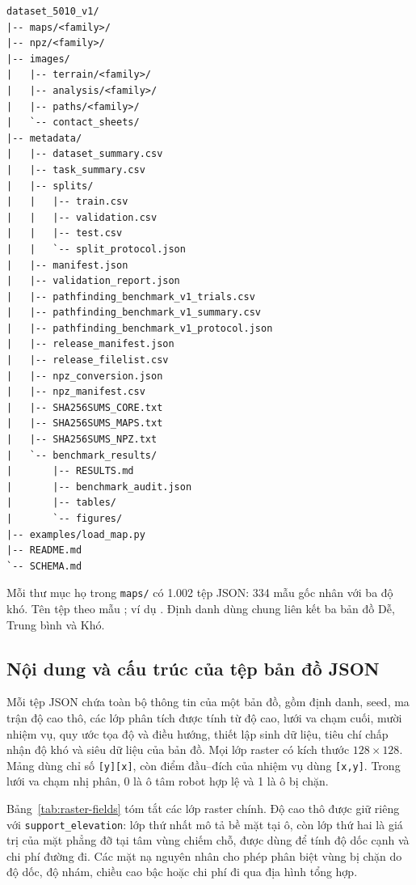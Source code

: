 \documentclass[11pt]{article}
\begin{document}
\begin{verbatim}
dataset_5010_v1/
|-- maps/<family>/
|-- npz/<family>/
|-- images/
|   |-- terrain/<family>/
|   |-- analysis/<family>/
|   |-- paths/<family>/
|   `-- contact_sheets/
|-- metadata/
|   |-- dataset_summary.csv
|   |-- task_summary.csv
|   |-- splits/
|   |   |-- train.csv
|   |   |-- validation.csv
|   |   |-- test.csv
|   |   `-- split_protocol.json
|   |-- manifest.json
|   |-- validation_report.json
|   |-- pathfinding_benchmark_v1_trials.csv
|   |-- pathfinding_benchmark_v1_summary.csv
|   |-- pathfinding_benchmark_v1_protocol.json
|   |-- release_manifest.json
|   |-- release_filelist.csv
|   |-- npz_conversion.json
|   |-- npz_manifest.csv
|   |-- SHA256SUMS_CORE.txt
|   |-- SHA256SUMS_MAPS.txt
|   |-- SHA256SUMS_NPZ.txt
|   `-- benchmark_results/
|       |-- RESULTS.md
|       |-- benchmark_audit.json
|       |-- tables/
|       `-- figures/
|-- examples/load_map.py
|-- README.md
`-- SCHEMA.md
\end{verbatim}

Mỗi thư mục họ trong \texttt{maps/} có 1.002 tệp JSON: 334 mẫu gốc nhân với ba
độ khó. Tên tệp theo mẫu
; ví dụ
. Định danh dùng chung
 liên kết ba bản đồ Dễ, Trung bình và Khó.

\subsection{Nội dung và cấu trúc của tệp bản đồ JSON}

Mỗi tệp JSON chứa toàn bộ thông tin của một bản đồ, gồm định danh, seed, ma trận
độ cao thô, các lớp phân tích được tính từ độ cao, lưới va chạm cuối, mười nhiệm
vụ, quy ước tọa độ và điều hướng, thiết lập sinh dữ liệu, tiêu chí chấp nhận độ
khó và siêu dữ liệu của bản đồ. Mọi lớp raster có kích thước
$128\times128$. Mảng dùng chỉ số \texttt{[y][x]}, còn điểm đầu--đích của nhiệm vụ
dùng \texttt{[x,y]}. Trong lưới va chạm nhị phân, 0 là ô tâm robot hợp lệ và 1
là ô bị chặn.

Bảng~\ref{tab:raster-fields} tóm tắt các lớp raster chính. Độ cao thô được giữ
riêng với \texttt{support\_elevation}: lớp thứ nhất mô tả bề mặt tại ô, còn lớp
thứ hai là giá trị của mặt phẳng đỡ tại tâm vùng chiếm chỗ, được dùng để
tính độ dốc cạnh và chi phí đường đi.
Các mặt nạ nguyên nhân cho phép phân biệt vùng bị chặn do độ dốc, độ nhám,
chiều cao bậc hoặc chi phí đi qua địa hình tổng hợp.
\end{document}
